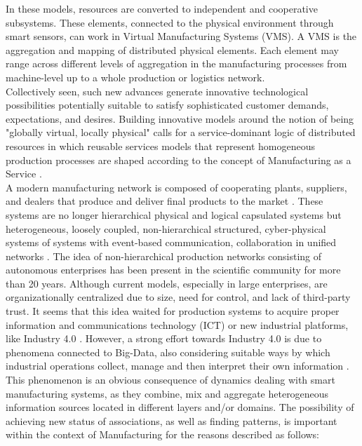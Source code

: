In these models, resources are converted to independent and cooperative subsystems. These elements, connected to the physical environment through smart sensors, can work in Virtual Manufacturing Systems (VMS). A VMS is the aggregation and mapping of distributed physical elements. Each element may range across different levels of aggregation in the manufacturing processes from machine-level up to a whole production or logistics network.\\
Collectively seen, such new advances generate innovative technological possibilities potentially suitable to satisfy sophisticated customer demands, expectations, and desires. Building innovative models around the notion of being "globally virtual, locally physical" calls for a service-dominant logic of distributed resources in which reusable services models that represent homogeneous production processes are shaped according to the concept of Manufacturing as a Service \parencite{kayabay_wip_2018}.\\
A modern manufacturing network is composed of cooperating plants, suppliers, and dealers that produce and deliver final products to the market \parencite{mourtzis_design_2013}. These systems are no longer hierarchical physical and logical capsulated systems but heterogeneous, loosely coupled, non-hierarchical structured, cyber-physical systems of systems with event-based communication, collaboration in unified networks \parencite{nagorny_big_2017}. The idea of non-hierarchical production networks consisting of autonomous enterprises has been present in the scientific community for more than 20 years. Although current models, especially in large enterprises, are organizationally centralized due to size, need for control, and lack of third-party trust. It seems that this idea waited for production systems to acquire proper information and communications technology (ICT) or new industrial platforms, like Industry 4.0 \parencite{mladineo_solving_2017}. However, a strong effort towards Industry 4.0 is due to phenomena connected to Big-Data, also considering suitable ways by which industrial operations collect, manage and then interpret their own information \parencite{chen_data_2015}. This phenomenon is an obvious consequence of dynamics dealing with smart manufacturing systems, as they combine, mix and aggregate heterogeneous information sources located in different layers and/or domains. The possibility of achieving new status of associations, as well as finding patterns, is important within the context of Manufacturing for the reasons described as follows:
